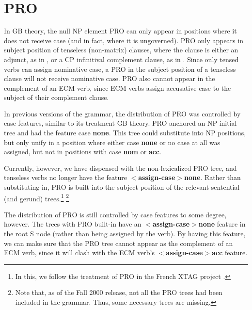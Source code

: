 \section{PRO}

In GB theory, the null NP element PRO can only appear in positions where it
does not receive case (and in fact, where it is ungoverned). PRO only appears
in subject position of tenseless (non-matrix) clauses, where the clause is
either an adjunct, as in , or a CP infinitival complement clause, as in
. Since only tensed verbs can assign nominative case, a PRO in the
subject position of a tenseless clause will not receive nominative case. PRO
also cannot appear in the complement of an ECM verb, since ECM verbs assign
accusative case to the subject of their complement clause.


In previous versions of the grammar, the distribution of PRO was controlled by
case features, similar to its treatment GB theory. PRO anchored an NP initial
tree and had the feature case {\bf none}. This tree could substitute into NP
positions, but only unify in a position where either case {\bf none} or no case
at all was assigned, but not in positions with case {\bf nom} or {\bf acc}.

Currently, however, we have dispensed with the non-lexicalized PRO tree, and
tenseless verbs no longer have the 
feature {\bf $<$assign-case$>$none}. Rather than substituting in, PRO
is built into the subject position of the relevant sentential (and gerund)
trees.\footnote{In this, we follow the treatment of PRO in the French XTAG
project \cite{ACK00}.} \footnote{Note that, as of the Fall 2000 release, not
all the PRO trees had been included in the grammar. Thus, some necessary trees
are missing.}

The distribution of PRO is still controlled by case features to some degree,
however. The trees with PRO built-in have an {\bf $<$assign-case$>$none}
feature in the root S node (rather than being assigned by the verb). By having
this feature, we can make sure that the PRO tree cannot appear as the
complement of an ECM verb, since it will clash with the ECM verb's {\bf
$<$assign-case$>$acc} feature. 


